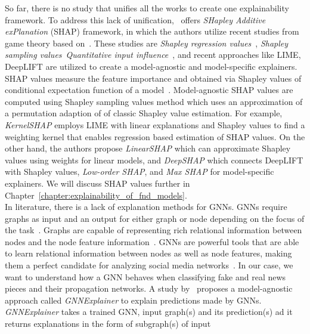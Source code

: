 So far, there is no study that unifies all the works to create one explainability framework. To address this lack of unification,~\cite{AUnifiedApproach_Lundberg} offers \emph{SHapley Additive exPlanation} (SHAP) framework, in which the authors utilize recent studies from game theory based on~\parencite{GameTheory_Shapley}. These studies are \emph{Shapley regression values}~\parencite{AnalysisOfRegressionInGameTheory_Lipovetsky}, \emph{Shapley sampling values}~\parencite{ExplainingPredictionModels_Strumbelj}\emph{Quantitative input influence}~\parencite{AlgorithmicTransparencyViaQuantitativeInputInfluence_Datta}, and recent approaches like LIME, DeepLIFT are utilized to create a model-agnostic and model-specific explainers. SHAP values measure the feature importance and obtained via Shapley values of conditional expectation function of a model~\parencite{AUnifiedApproach_Lundberg}. Model-agnostic SHAP values are computed using Shapley sampling values method which uses an approximation of a permutation adaption of of classic Shapley value estimation. For example, \emph{KernelSHAP} employs LIME with linear explanations and Shapley values to find a weighting kernel that enables regression based estimation of SHAP values. On the other hand, the authors propose \emph{LinearSHAP} which can approximate Shapley values using weights for linear models, and \emph{DeepSHAP} which connects DeepLIFT with Shapley values, \emph{Low-order SHAP}, and \emph{Max SHAP} for model-specific explainers. We will discuss SHAP values further in Chapter~\ref{chapter:explainability_of_fnd_models}.\\
In literature, there is a lack of explanation methods for GNNs. GNNs require graphs as input and an output for either graph or node depending on the focus of the task~\parencite{DeepLearningOnGraphs_Zhang}. Graphs are capable of representing rich relational information between nodes and the node feature
information~\parencite{DeepLearningOnGraphs_Zhang, GNNsAReview_Zhou}. GNNs are powerful tools that are able to learn relational information between nodes as well as node features, making them a perfect candidate for analyzing social media networks~\parencite{BeyondSigmoids_Zang}. In our case, we want to understand how a GNN behaves when classifying fake and real news pieces and their propagation networks. A study by~\cite{GNNExplainer_Ying} proposes a model-agnostic approach called \emph{GNNExplainer} to explain predictions made by GNNs. \emph{GNNExplainer} takes a trained GNN, input graph(s) and its prediction(s) ad it returns explanations in the form of subgraph(s) of input

